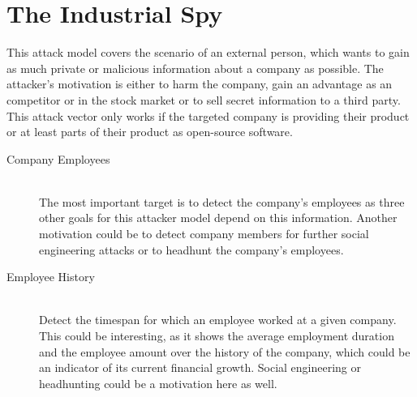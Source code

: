 \section{The Industrial Spy}
This attack model covers the scenario of an external person, which wants to gain as much private or malicious information about a company as possible.
The attacker's motivation is either to harm the company, gain an advantage as an competitor or in the stock market or to sell secret information to a third party.
This attack vector only works if the targeted company is providing their product or at least parts of their product as open-source software.

\begin{description}
    \item[Company Employees] \hfill \\
        The most important target is to detect the company's employees as three other goals for this attacker model depend on this information.
        Another motivation could be to detect company members for further social engineering attacks or to headhunt the company's employees.

    \item[Employee History] \hfill \\
        Detect the timespan for which an employee worked at a given company.
        This could be interesting, as it shows the average employment duration and the employee amount over the history of the company, which could be an indicator of its current financial growth.
        Social engineering or headhunting could be a motivation here as well.


\end{description}
